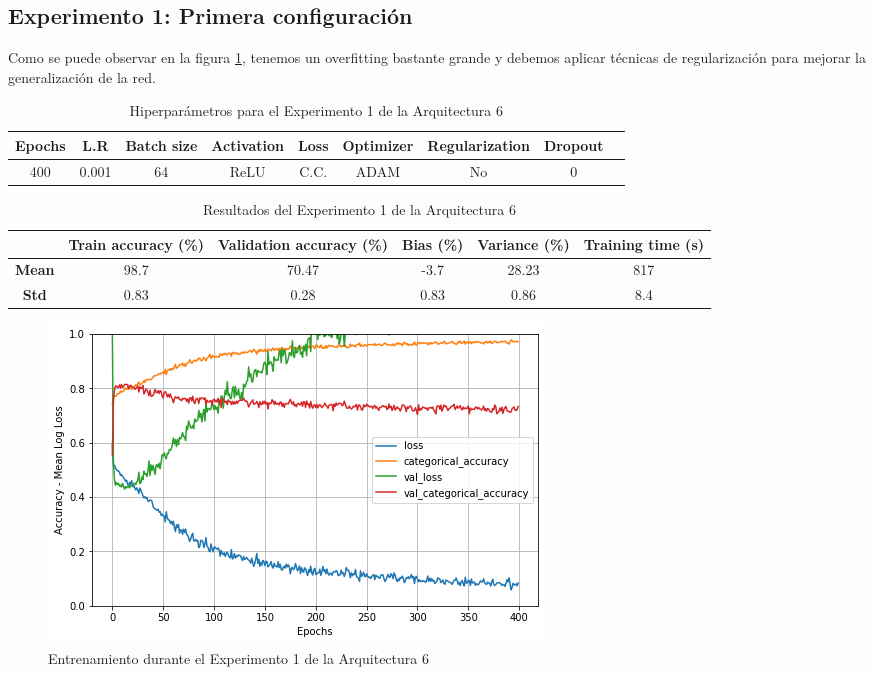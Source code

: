 \documentclass{article}
\begin{document}
		\subsection{Experimento 1: Primera configuraci\'on}
        \label{s-a6-e1}
            Como se puede observar en la figura \ref{tab:tr-a6-e1}, tenemos un overfitting bastante grande y debemos aplicar t\'ecnicas de regularizaci\'on para mejorar la generalizaci\'on de la red. 
            \begin{table}[!h]
				\begin{tabular}{|c|c|c|c|c|c|c|c|c|}
					\textbf{Epochs}&\textbf{L.R}&\textbf{Batch size}&\textbf{Activation}&\textbf{Loss}&\textbf{Optimizer}&\textbf{Regularization}&\textbf{Dropout}   \\ \hline
					400 & 0.001 & 64 & ReLU & C.C. & ADAM & No & 0 
				\end{tabular}
				\caption{Hiperpar\'ametros para el Experimento 1 de la Arquitectura 6}
				\label{tab:hip-a6-e1}
			\end{table}
   
            \begin{table}[!h]
				\begin{center}
					\begin{tabular}{ c | c | c | c | c | c |}
						\ & \textbf{Train accuracy (\%)} & \textbf{Validation accuracy (\%)} & \textbf{Bias (\%)} & \textbf{Variance (\%)} & \textbf{Training time (s)} \\ \hline
						\textbf{Mean} & 98.7 & 70.47 & -3.7  & 28.23 & 817   \\ \hline
						\textbf{Std} &  0.83 & 0.28 &  0.83 & 0.86 & 8.4  \\ \hline
					\end{tabular}
					\caption{Resultados del Experimento 1 de la Arquitectura 6}
					\label{tab:res-a2-e5}
				\end{center}
			\end{table}
            
            \begin{figure}[!h]
				\begin{center}
					\includegraphics[scale=0.5]{b-tr-a6-e1.png}		
					\caption{Entrenamiento durante el Experimento 1 de la Arquitectura 6}	
					\label{tab:tr-a6-e1}
				\end{center}
			\end{figure}
   
\end{document}
